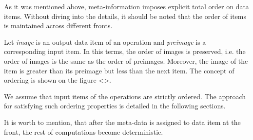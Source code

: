 
\label {fs-timing-model}

As it was mentioned above, meta-information imposes explicit total order on data items. Without diving into the details, it should be noted that the order of items is maintained across different fronts.

Let {\it image} is an output data item of an operation and {\it preimage} is a corresponding input item. In this terms, the order of images is preserved, i.e. the order of images is the same as the order of preimages. Moreover, the image of the item is greater than its preimage but less than the next item. The concept of ordering is shown on the figure <>.

We assume that input items of the operations are strictly ordered. The approach for satisfying such ordering properties is detailed in the following sections.

It is worth to mention, that after the meta-data is assigned to data item at the front, the rest of computations become deterministic.
